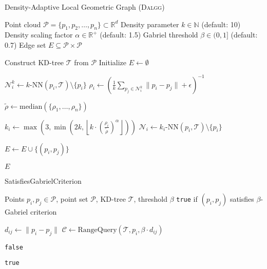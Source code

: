 \documentclass{article}
\newcommand{\dalgg}{\textsc{Dalgg}\xspace}
\newcommand{\R}{\mathbb{R}}
\newcommand{\N}{\mathbb{N}}
\begin{document}
\begin{algorithm}
\caption{Density-Adaptive Local Geometric Graph (\dalgg)}
\label{alg:dalgg}
\begin{algorithmic}[1]
\REQUIRE Point cloud $\mathcal{P} = \{p_1, p_2, \ldots, p_n\} \subset \R^d$
\REQUIRE Density parameter $k \in \N$ (default: 10)
\REQUIRE Density scaling factor $\alpha \in \R^+$ (default: 1.5)
\REQUIRE Gabriel threshold $\beta \in (0, 1]$ (default: 0.7)
\ENSURE Edge set $E \subseteq \mathcal{P} \times \mathcal{P}$

\STATE Construct KD-tree $\mathcal{T}$ from $\mathcal{P}$ 
\STATE Initialize $E \leftarrow \emptyset$

\STATE {}
    \STATE $\mathcal{N}_i^k \leftarrow k\text{-NN}(p_i, \mathcal{T}) \setminus \{p_i\}$ 
    \STATE $\rho_i \leftarrow \left(\frac{1}{k}\sum_{p_j \in \mathcal{N}_i^k} \|p_i - p_j\| + \epsilon\right)^{-1}$
\ENDFOR

\STATE $\tilde{\rho} \leftarrow \text{median}(\{\rho_1, \ldots, \rho_n\})$

\STATE {}
    \STATE $k_i \leftarrow \max\left(3, \min\left(2k, \left\lfloor k \cdot \left(\frac{\rho_i}{\tilde{\rho}}\right)^{\alpha} \right\rfloor\right)\right)$
    \STATE $\mathcal{N}_i \leftarrow k_i\text{-NN}(p_i, \mathcal{T}) \setminus \{p_i\}$
    
     
            \STATE $E \leftarrow E \cup \{(p_i, p_j)\}$
        \ENDIF
    \ENDFOR
\ENDFOR

\RETURN $E$
\end{algorithmic}
\end{algorithm}

\begin{algorithm}
\caption{SatisfiesGabrielCriterion}
\label{alg:gabriel}
\begin{algorithmic}[1]
\REQUIRE Points $p_i, p_j \in \mathcal{P}$, point set $\mathcal{P}$, KD-tree $\mathcal{T}$, threshold $\beta$
\ENSURE \texttt{true} if $(p_i, p_j)$ satisfies $\beta$-Gabriel criterion

\STATE $d_{ij} \leftarrow \|p_i - p_j\|$
\STATE $\mathcal{C} \leftarrow \text{RangeQuery}(\mathcal{T}, p_i, \beta \cdot d_{ij})$ 

        \RETURN \texttt{false} 
    \ENDIF
\ENDFOR

\RETURN \texttt{true}
\end{algorithmic}
\end{algorithm}
\end{document}
